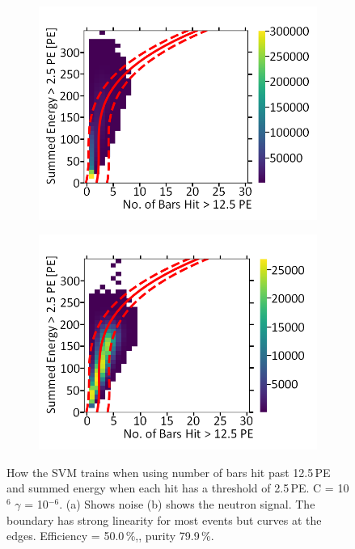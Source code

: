 \begin{figure}[!h]
\centering
\begin{subfigure}{.5\textwidth}
  \centering
  \includegraphics[width=\linewidth]{Appendix1/Figs/Bars2Sum1Noise.png}
  \captionsetup{width=.9\linewidth}
  \caption{}
  \label{subFig:Bars2Sum1Noise}
\end{subfigure}%
\begin{subfigure}{.5\textwidth}
  \centering
\includegraphics[width=\linewidth]{Appendix1/Figs/Bars2Sum1Signal.png}
  \captionsetup{width=.9\linewidth}
  \caption{}
  \label{subFig:Bars2Sum1Signal}
\end{subfigure}
\caption{How the SVM trains when using number of bars hit past 12.5\,PE and summed energy when each hit has a threshold of 2.5\,PE. C = 10$^6$ $\gamma$ = 10$^{-6}$. (a) Shows noise (b) shows the neutron signal. The boundary has strong linearity for most events but curves at the edges. Efficiency = 50.0\,\%,, purity 79.9\,\%.}
\label{fig:Bars2Sum1SignalNoise}
\end{figure}

